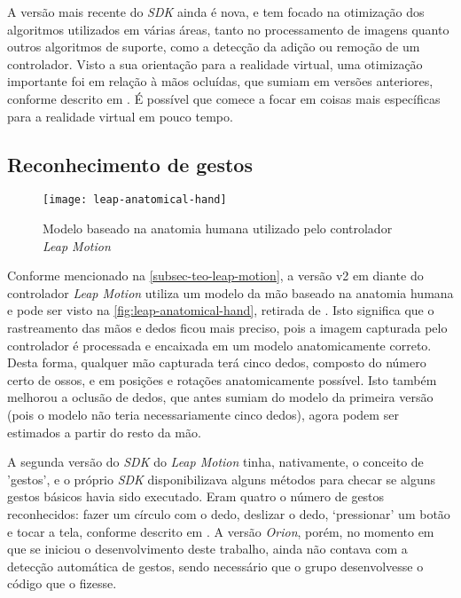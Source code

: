 A versão mais recente do \textit{SDK} ainda é nova, e tem focado na otimização dos 
algoritmos utilizados em várias áreas, tanto no processamento de imagens quanto 
outros algoritmos de suporte, como a detecção da adição ou remoção de um 
controlador. Visto a sua orientação para a realidade virtual, uma otimização 
importante foi em relação à mãos ocluídas, que sumiam em versões anteriores, 
conforme descrito em \cite{leap:2016:changeset}. É possível que comece a focar 
em coisas mais específicas para a realidade virtual em pouco tempo.

\subsection{Reconhecimento de gestos}\label{subsubsec-teo-gestos}

\begin{figure}[h]
	\centering
	\caption{Modelo baseado na anatomia humana utilizado pelo controlador \textit{Leap Motion}}
	\texttt{[image: leap-anatomical-hand]}
	\label{fig:leap-anatomical-hand}
\end{figure}

Conforme mencionado na \autoref{subsec-teo-leap-motion}, a versão 
v2 em diante do controlador \textit{Leap Motion} utiliza um modelo 
da mão baseado na anatomia humana e pode ser visto 
na \autoref{fig:leap-anatomical-hand}, retirada de \cite{leap:2016:intro-skeletal}. Isto significa que o 
rastreamento das mãos e dedos ficou mais preciso, pois a 
imagem capturada pelo controlador é processada e encaixada em 
um modelo anatomicamente correto. Desta forma, qualquer mão 
capturada terá cinco dedos, composto do número certo de ossos, e 
em posições e rotações anatomicamente possível. Isto também 
melhorou a oclusão de dedos, que antes sumiam do modelo da 
primeira versão (pois o modelo não teria necessariamente cinco dedos), 
agora podem ser estimados a partir do resto da mão.

A segunda versão do \textit{SDK} do \textit{Leap Motion} 
tinha, nativamente, o conceito de 'gestos', e o próprio 
\textit{SDK} disponibilizava alguns métodos para checar 
se alguns gestos básicos havia sido executado. Eram quatro 
o número de gestos reconhecidos: fazer um círculo com o 
dedo, deslizar o dedo, `pressionar' um botão e tocar a 
tela, conforme descrito em \cite{leap:2016:gestures}. A 
versão \textit{Orion}, porém, no momento em que se 
iniciou o desenvolvimento deste trabalho, ainda não 
contava com a detecção automática de gestos, sendo 
necessário que o grupo desenvolvesse o código que o fizesse.

